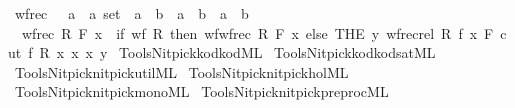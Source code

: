 \begin{isabellebody}
\isanewline
{}\isamarkupfalse%
\ wfrec{\isacharprime}{\kern0pt}\ {\isacharcolon}{\kern0pt}{\isacharcolon}{\kern0pt}\ \ {\isachardoublequoteopen}{\isacharparenleft}{\kern0pt}{\isacharprime}{\kern0pt}a\ {\isasymtimes}\ {\isacharprime}{\kern0pt}a{\isacharparenright}{\kern0pt}\ set\ {\isasymRightarrow}\ {\isacharparenleft}{\kern0pt}{\isacharparenleft}{\kern0pt}{\isacharprime}{\kern0pt}a\ {\isasymRightarrow}\ {\isacharprime}{\kern0pt}b{\isacharparenright}{\kern0pt}\ {\isasymRightarrow}\ {\isacharprime}{\kern0pt}a\ {\isasymRightarrow}\ {\isacharprime}{\kern0pt}b{\isacharparenright}{\kern0pt}\ {\isasymRightarrow}\ {\isacharprime}{\kern0pt}a\ {\isasymRightarrow}\ {\isacharprime}{\kern0pt}b{\isachardoublequoteclose}\ \isanewline
\ \ {\isachardoublequoteopen}wfrec{\isacharprime}{\kern0pt}\ R\ F\ x\ {\isasymequiv}\ if\ wf\ R\ then\ wf{\isacharunderscore}{\kern0pt}wfrec{\isacharprime}{\kern0pt}\ R\ F\ x\ else\ THE\ y{\isachardot}{\kern0pt}\ wfrec{\isacharunderscore}{\kern0pt}rel\ R\ {\isacharparenleft}{\kern0pt}{\isasymlambda}f\ x{\isachardot}{\kern0pt}\ F\ {\isacharparenleft}{\kern0pt}cut\ f\ R\ x{\isacharparenright}{\kern0pt}\ x{\isacharparenright}{\kern0pt}\ x\ y{\isachardoublequoteclose}\isanewline
%
\isadelimML
\isanewline
%
\endisadelimML
%
\isatagML
{}\isamarkupfalse%
\ {\isacartoucheopen}Tools{\isacharslash}{\kern0pt}Nitpick{\isacharslash}{\kern0pt}kodkod{\isachardot}{\kern0pt}ML{\isacartoucheclose}\isanewline
{}\isamarkupfalse%
\ {\isacartoucheopen}Tools{\isacharslash}{\kern0pt}Nitpick{\isacharslash}{\kern0pt}kodkod{\isacharunderscore}{\kern0pt}sat{\isachardot}{\kern0pt}ML{\isacartoucheclose}\isanewline
{}\isamarkupfalse%
\ {\isacartoucheopen}Tools{\isacharslash}{\kern0pt}Nitpick{\isacharslash}{\kern0pt}nitpick{\isacharunderscore}{\kern0pt}util{\isachardot}{\kern0pt}ML{\isacartoucheclose}\isanewline
{}\isamarkupfalse%
\ {\isacartoucheopen}Tools{\isacharslash}{\kern0pt}Nitpick{\isacharslash}{\kern0pt}nitpick{\isacharunderscore}{\kern0pt}hol{\isachardot}{\kern0pt}ML{\isacartoucheclose}\isanewline
{}\isamarkupfalse%
\ {\isacartoucheopen}Tools{\isacharslash}{\kern0pt}Nitpick{\isacharslash}{\kern0pt}nitpick{\isacharunderscore}{\kern0pt}mono{\isachardot}{\kern0pt}ML{\isacartoucheclose}\isanewline
{}\isamarkupfalse%
\ {\isacartoucheopen}Tools{\isacharslash}{\kern0pt}Nitpick{\isacharslash}{\kern0pt}nitpick{\isacharunderscore}{\kern0pt}preproc{\isachardot}{\kern0pt}ML{\isacartoucheclose}\isanewline

\end{isabellebody}
